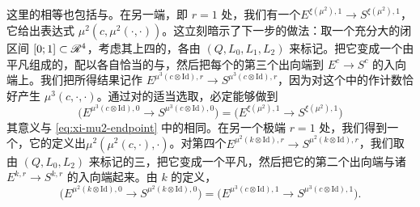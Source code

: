 这里的相等也包括\trBoundaryCondition{}与\trPerturbationDatum。在另一端，即 $r=1$ 处，我们有一个\trFibration{}$E^{\xi(\mu^2),1}\to S^{\xi(\mu^2),1}$，它给出表达式 $\mu^2(c,\mu^2(\cdot,\cdot))$。这立刻暗示了下一步的做法：取一个充分大的闭区间 $[0;1]\subset\mathscr{R}^4$，考虑其上四\trPointedDisc{}的\trUniversal\trFamily，各\trBoundaryComponent{}由 $(Q,L_0,L_1,L_2)$ 来标记。把它变成一个由平凡\trLefschetzFibration{}组成的\trFamily，配以各自恰当的\trBoundaryCondition{}与\trPerturbationDatum，然后把每个\trDisk{}的第三个出向端\trGluing{}到 $E^c\to S^c$ 的入向端上。我们把所得结果记作 $E^{\mu^3(c\otimes\mathrm{Id}),r}\to S^{\mu^3(c\otimes\mathrm{Id}),r}$，因为对这个\trFamily{}中的\trPseudoholomorphic\trSection{}作计数恰好产生 $\mu^3(c,\cdot,\cdot)$。通过对\trGluingParameter{}的适当选取，必定能够做到
\begin{equation*}
\bigl(E^{\mu^3(c\otimes\mathrm{Id}),0}\to S^{\mu^3(c\otimes\mathrm{Id}),0}\bigr)=\bigl(E^{\xi(\mu^2),1}\to S^{\xi(\mu^2),1}\bigr)
\end{equation*}
其意义与 \eqref{eq:xi-mu2-endpoint} 中的相同。在另一个极端 $r=1$ 处，我们得到一个\trLefschetzFibration，它的\trSection{}定义出\trHomomorphism{}$\mu^2(\mu^2(c,\cdot),\cdot)$。对第四个\trFamily{}$E^{\mu^2(k\otimes\mathrm{Id}),r}\to S^{\mu^2(k\otimes\mathrm{Id}),r}$，我们取\trBoundaryComponent{}由 $(Q,L_0,L_2)$ 来标记的三\trPointedDisc，把它变成一个平凡\trLefschetzFibration，然后把它的第二个出向端与诸\trFibration{}$E^{k,r}\to S^{k,r}$ 的入向端\trGluing{}起来。由 $k$ 的定义，
\begin{equation*}
\bigl(E^{\mu^2(k\otimes\mathrm{Id}),0}\to S^{\mu^2(k\otimes\mathrm{Id}),0}\bigr)=\bigl(E^{\mu^3(c\otimes\mathrm{Id}),1}\to S^{\mu^3(c\otimes\mathrm{Id}),1}\bigr).
\end{equation*}

